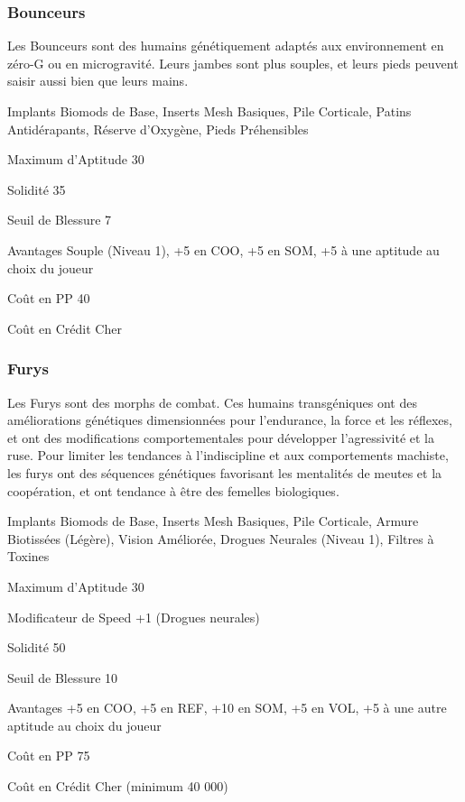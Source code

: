 \subsubsection{Bounceurs} \label{sec:starting-bouncers} 

Les Bounceurs sont des humains génétiquement adaptés aux environnement en zéro-G ou en microgravité. Leurs jambes sont plus souples, et leurs pieds peuvent saisir aussi bien que leurs mains. 

\begin{description*} \item[Implants] Biomods de Base, Inserts Mesh Basiques, Pile Corticale, Patins Antidérapants, Réserve d'Oxygène, Pieds Préhensibles\item[Maximum d'Aptitude] 30 \item[Solidité] 35 \item[Seuil de Blessure] 7 \item[Avantages] Souple (Niveau 1), +5 en COO, +5 en SOM, +5 à une aptitude au choix du joueur\item[Coût en PP] 40 \item[Coût en Crédit] Cher \end{description*} 

\subsubsection{Furys} \label{sec:starting-furies} 

Les Furys sont des morphs de combat. Ces humains transgéniques ont des améliorations génétiques dimensionnées pour l'endurance, la force et les réflexes, et ont des modifications comportementales pour développer l'agressivité et la ruse. Pour limiter les tendances à l'indiscipline et aux comportements machiste, les furys ont des séquences génétiques favorisant les mentalités de meutes et la coopération, et ont tendance à être des femelles biologiques. 

\begin{description*} \item[Implants] Biomods de Base, Inserts Mesh Basiques, Pile Corticale, Armure Biotissées (Légère), Vision Améliorée, Drogues Neurales (Niveau 1), Filtres à Toxines\item[Maximum d'Aptitude] 30 \item[Modificateur de Speed] +1 (Drogues neurales) \item [Solidité] 50 \item[Seuil de Blessure] 10 \item[Avantages] +5 en COO, +5 en REF, +10 en SOM, +5 en VOL, +5 à une autre aptitude au choix du joueur\item[Coût en PP] 75 \item[Coût en Crédit] Cher (minimum 40 000) \end{description*} 

